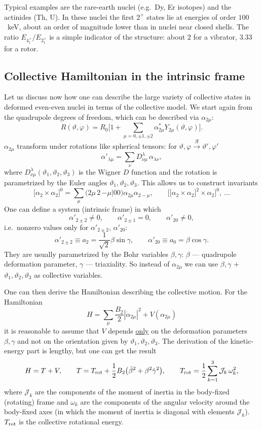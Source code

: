 \documentclass[11pt,a4paper]{article}
\begin{document}
Typical examples are the rare-earth nuclei (e.g.\ Dy, Er isotopes) and the actinides (Th, U). In these nuclei the first $2^+$ states lie at energies of order $100$~keV, about an order of magnitude lower than in nuclei near closed shells. The ratio $E_{4^+_1}/E_{2^+_1}$ is a simple indicator of the structure: about $2$ for a vibrator, $3.33$ for a rotor.


\subsection{Collective Hamiltonian in the intrinsic frame}
Let us discuss now how one can describe the large variety of collective states in deformed even-even nuclei in terms of the collective model. We start again from the quadrupole degrees of freedom, which can be described via $\alpha_{2\mu}$:
\[
R(\vartheta,\varphi)=R_0\Big[1+\sum_{\mu=0,\pm1,\pm2}\alpha^*_{2\mu}Y_{2\mu}(\vartheta,\varphi)\Big].
\]
$\alpha_{2\mu}$ transform under rotations like spherical tensors: for $\vartheta,\varphi\xrightarrow{\ \mathcal R\ }\vartheta',\varphi'$
\[
\alpha'_{\lambda\mu}=\sum_\nu D^\lambda_{\nu\mu}\,\alpha_{\lambda\nu},
\]
where $D^\lambda_{\nu\mu}(\vartheta_1,\vartheta_2,\vartheta_3)$ is the Wigner $D$ function and the rotation is parametrized by the Euler angles $\vartheta_1,\vartheta_2,\vartheta_3$. This allows us to construct invariants
\[
\big[\alpha_2\times\alpha_2\big]^0=\sum_\mu\big(2\mu\,2\,{-\mu}\big|00\big)\alpha_{2\mu}\alpha_{2-\mu},\qquad
\Big[\big[\alpha_2\times\alpha_2\big]^2\times\alpha_2\Big]^0,\ \dots
\]
One can define a system (intrinsic frame) in which
\[
\alpha'_{2\pm2}\neq0,\qquad \alpha'_{2\pm1}=0,\qquad \alpha'_{20}\neq0,
\]
i.e.\ nonzero values only for $\alpha'_{2\pm2}$, $\alpha'_{20}$:
\[
\alpha'_{2\pm2}\equiv a_2=\frac{1}{\sqrt2}\beta\sin\gamma,\qquad \alpha'_{20}\equiv a_0=\beta\cos\gamma .
\]
They are usually parametrized by the Bohr variables $\beta,\gamma$: $\beta$ --- quadrupole deformation parameter, $\gamma$ --- triaxiality. So instead of $\alpha_{2\mu}$ we can use $\beta,\gamma$ $+$ $\vartheta_1,\vartheta_2,\vartheta_3$ as collective variables.

One can then derive the Hamiltonian describing the collective motion. For the Hamiltonian
\[
H=\sum_\mu\frac{B_2}{2}|\dot\alpha_{2\mu}|^2+V(\alpha_{2\mu})
\]
it is reasonable to assume that $V$ depends \underline{only} on the deformation parameters $\beta,\gamma$ and not on the orientation given by $\vartheta_1,\vartheta_2,\vartheta_3$. The derivation of the kinetic-energy part is lengthy, but one can get the result
\[
H=T+V,\qquad
T=T_{\rm rot}+\frac12B_2\big(\dot\beta^2+\beta^2\dot\gamma^2\big),\qquad
T_{\rm rot}=\frac12\sum_{k=1}^3\mathcal J_k\,\omega_k^2 ,
\]
where $\mathcal J_k$ are the components of the moment of inertia in the body-fixed (rotating) frame and $\omega_k$ are the components of the angular velocity around the body-fixed axes (in which the moment of inertia is diagonal with elements $\mathcal J_k$). $T_{\rm rot}$ is the collective rotational energy.
\end{document}
